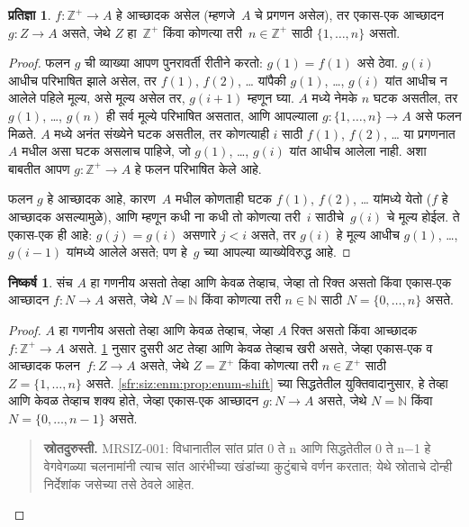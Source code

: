 \documentclass[11pt,a4paper,openany]{book}
\theoremstyle{definition}
\newtheorem{prop}[defn]{प्रतिज्ञा}
\newcommand{\Nat}{\mathbb{N}}
\newcommand{\PosInt}{\mathbb{Z}^{+}}
\newtheorem{cor}[defn]{निष्कर्ष}
\begin{document}
\begin{prop}\label{sfr:siz:enm:prop:enum-bij}
$f\colon \PosInt \to A$ हे आच्छादक असेल (म्हणजे~$A$
चे प्रगणन असेल), तर एकास-एक आच्छादन $g\colon Z \to A$ असते,
जेथे $Z$ हा~$\PosInt$ किंवा कोणत्या तरी~$n \in \PosInt$
साठी $\{1, \dots, n\}$ असतो.
\end{prop}

\begin{proof}
  फलन $g$ ची व्याख्या आपण पुनरावर्ती रीतीने करतो: $g(1) = f(1)$
  असे ठेवा. $g(i)$ आधीच परिभाषित झाले असेल, तर $f(1)$, $f(2)$,
  \dots{} यांपैकी $g(1)$, \dots, $g(i)$ यांत आधीच न आलेले
  पहिले मूल्य, असे मूल्य असेल तर, $g(i+1)$ म्हणून घ्या.
  $A$ मध्ये नेमके $n$ घटक असतील, तर $g(1)$, \dots, $g(n)$
  ही सर्व मूल्ये परिभाषित असतात, आणि आपल्याला
  $g\colon \{1, \dots, n\} \to A$ असे फलन मिळते.
  $A$ मध्ये अनंत संख्येने घटक असतील, तर कोणत्याही $i$
  साठी $f(1)$, $f(2)$, \dots{} या प्रगणनात~$A$ मधील असा
  घटक असलाच पाहिजे, जो $g(1)$, \dots, $g(i)$ यांत
  आधीच आलेला नाही. अशा बाबतीत आपण $g\colon \PosInt \to A$
  हे फलन परिभाषित केले आहे.

  फलन $g$ हे आच्छादक आहे, कारण~$A$ मधील कोणताही घटक
  $f(1)$, $f(2)$, \dots{} यांमध्ये येतो ($f$ हे आच्छादक
  असल्यामुळे), आणि म्हणून कधी ना कधी तो कोणत्या तरी~$i$
  साठीचे~$g(i)$ चे मूल्य होईल. ते एकास-एक ही आहे:
  $g(j) = g(i)$ असणारे $j < i$ असते, तर $g(i)$ हे मूल्य
  आधीच $g(1)$, \dots, $g(i-1)$ यांमध्ये आलेले असते;
  पण हे~$g$ च्या आपल्या व्याख्येविरुद्ध आहे.
\end{proof}

\begin{cor}\label{sfr:siz:enm:cor:enum-nat-bij}
संच $A$ हा गणनीय असतो तेव्हा आणि केवळ तेव्हाच, जेव्हा
तो रिक्त असतो किंवा एकास-एक आच्छादन $f\colon N \to A$ असते,
जेथे $N = \Nat$ किंवा कोणत्या तरी $n \in \Nat$ साठी
$N = \{0, \dots, n\}$ असते.
\end{cor}

\begin{proof}
$A$ हा गणनीय असतो तेव्हा आणि केवळ तेव्हाच, जेव्हा $A$
रिक्त असतो किंवा आच्छादक $f\colon \PosInt \to A$ असते.
\ref{sfr:siz:enm:prop:enum-bij} नुसार दुसरी अट तेव्हा आणि केवळ तेव्हाच
खरी असते, जेव्हा एकास-एक व आच्छादक फलन~$f\colon Z \to A$ असते,
जेथे $Z = \PosInt$ किंवा कोणत्या तरी $n \in \PosInt$ साठी
$Z = \{1, \dots, n\}$ असते. \ref{sfr:siz:enm:prop:enum-shift} च्या
सिद्धतेतील युक्तिवादानुसार, हे तेव्हा आणि केवळ तेव्हाच शक्य होते,
जेव्हा एकास-एक आच्छादन $g\colon N \to A$ असते, जेथे
$N = \Nat$ किंवा $N = \{0, \dots, n-1\}$ असते.
\begin{quote}\small\textbf{स्रोतदुरुस्ती.} MRSIZ-001: विधानातील सांत प्रांत 0 ते n आणि सिद्धतेतील 0 ते n−1 हे वेगवेगळ्या चलनामांनी त्याच सांत आरंभीच्या खंडांच्या कुटुंबाचे वर्णन करतात; येथे स्रोताचे दोन्ही निर्देशांक जसेच्या तसे ठेवले आहेत.\end{quote}
\end{proof}
\end{document}

